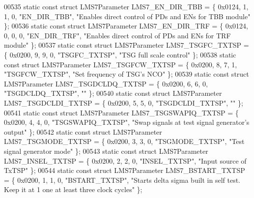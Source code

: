 \begin{DoxyCode}
00535 \textcolor{keyword}{static} \textcolor{keyword}{const} \textcolor{keyword}{struct }LMS7Parameter LMS7_EN_DIR_TBB = \{ 0x0124, 1, 1, 0, \textcolor{stringliteral}{"EN\_DIR\_TBB"}, \textcolor{stringliteral}{"Enables direct
       control of PDs and ENs for TBB module"} \};
00536 \textcolor{keyword}{static} \textcolor{keyword}{const} \textcolor{keyword}{struct }LMS7Parameter LMS7_EN_DIR_TRF = \{ 0x0124, 0, 0, 0, \textcolor{stringliteral}{"EN\_DIR\_TRF"}, \textcolor{stringliteral}{"Enables direct
       control of PDs and ENs for TRF module"} \};
00537 \textcolor{keyword}{static} \textcolor{keyword}{const} \textcolor{keyword}{struct }LMS7Parameter LMS7_TSGFC_TXTSP = \{ 0x0200, 9, 9, 0, \textcolor{stringliteral}{"TSGFC\_TXTSP"}, \textcolor{stringliteral}{"TSG full scale
       control"} \};
00538 \textcolor{keyword}{static} \textcolor{keyword}{const} \textcolor{keyword}{struct }LMS7Parameter LMS7_TSGFCW_TXTSP = \{ 0x0200, 8, 7, 1, \textcolor{stringliteral}{"TSGFCW\_TXTSP"}, \textcolor{stringliteral}{"Set frequency of
       TSG's NCO"} \};
00539 \textcolor{keyword}{static} \textcolor{keyword}{const} \textcolor{keyword}{struct }LMS7Parameter LMS7_TSGDCLDQ_TXTSP = \{ 0x0200, 6, 6, 0, \textcolor{stringliteral}{"TSGDCLDQ\_TXTSP"}, \textcolor{stringliteral}{""} \};
00540 \textcolor{keyword}{static} \textcolor{keyword}{const} \textcolor{keyword}{struct }LMS7Parameter LMS7_TSGDCLDI_TXTSP = \{ 0x0200, 5, 5, 0, \textcolor{stringliteral}{"TSGDCLDI\_TXTSP"}, \textcolor{stringliteral}{""} \};
00541 \textcolor{keyword}{static} \textcolor{keyword}{const} \textcolor{keyword}{struct }LMS7Parameter LMS7_TSGSWAPIQ_TXTSP = \{ 0x0200, 4, 4, 0, \textcolor{stringliteral}{"TSGSWAPIQ\_TXTSP"}, \textcolor{stringliteral}{"Swap
       signals at test signal generator's output"} \};
00542 \textcolor{keyword}{static} \textcolor{keyword}{const} \textcolor{keyword}{struct }LMS7Parameter LMS7_TSGMODE_TXTSP = \{ 0x0200, 3, 3, 0, \textcolor{stringliteral}{"TSGMODE\_TXTSP"}, \textcolor{stringliteral}{"Test signal
       generator mode"} \};
00543 \textcolor{keyword}{static} \textcolor{keyword}{const} \textcolor{keyword}{struct }LMS7Parameter LMS7_INSEL_TXTSP = \{ 0x0200, 2, 2, 0, \textcolor{stringliteral}{"INSEL\_TXTSP"}, \textcolor{stringliteral}{"Input source of
       TxTSP"} \};
00544 \textcolor{keyword}{static} \textcolor{keyword}{const} \textcolor{keyword}{struct }LMS7Parameter LMS7_BSTART_TXTSP = \{ 0x0200, 1, 1, 0, \textcolor{stringliteral}{"BSTART\_TXTSP"}, \textcolor{stringliteral}{"Starts delta
       sigma built in self test. Keep it at 1 one at least three clock cycles"} \};

\end{DoxyCode}
